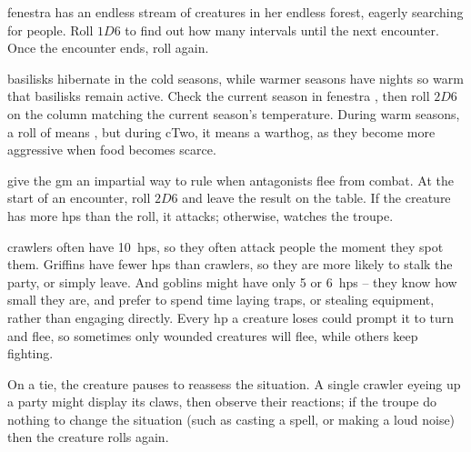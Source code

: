 \begin{multicols}{2}
\begin{figure*}[b!]
\begin{multicols}{3}
\end{multicols}

\end{figure*}

\noindent
\Gls{fenestra} has an endless stream of creatures in her endless forest, eagerly searching for people.
Roll $1D6$ to find out how many \glspl{interval} until the next encounter.
Once the encounter ends, roll again.

\Glspl{basilisk} hibernate in the cold seasons, while warmer seasons have nights so warm that \glspl{basilisk} remain active.
Check the current season in \gls{fenestra} , then roll $2D6$ on the column matching the current season's temperature.
During warm seasons, a roll of   means , but during \gls{cTwo}, it means a warthog, as they become more aggressive when food becomes scarce.

give the \gls{gm} an impartial way to rule when antagonists flee from combat.
At the start of an encounter, roll $2D6$ and leave the result on the table.
If the creature has more \glspl{hp} than the roll, it attacks; otherwise, watches the troupe.


\Glspl{crawler} often have 10~\glspl{hp}, so they often attack people the moment they spot them.
Griffins have fewer \glspl{hp} than \glspl{crawler}, so they are more likely to stalk the party, or simply leave.
And goblins might have only 5 or 6~\glspl{hp} -- they know how small they are, and prefer to spend time laying traps, or stealing equipment, rather than engaging directly.
Every \gls{hp} a creature loses could prompt it to turn and flee, so sometimes only wounded creatures will flee, while others keep fighting.

On a tie, the creature pauses to reassess the situation.
A single \gls{crawler} eyeing up a party might display its claws, then observe their reactions; if the troupe do nothing to change the situation (such as casting a spell, or making a loud noise) then the creature rolls again.


\end{multicols}
